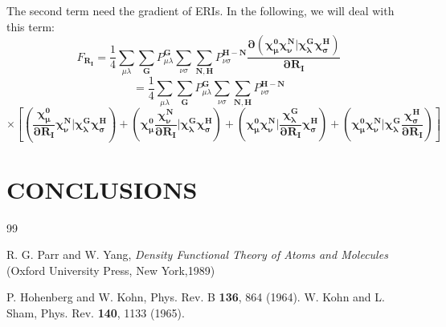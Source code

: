 \documentclass[aps,preprint,12pt]{revtex4-1}
\begin{document}
The second term need the gradient of ERIs. In the following, we will deal with this term: 
\[
 F_{\mathbf{R_I}}=\frac{1}{4}\sum_{\mu\lambda}\sum_{\mathbf{G}}P_{\mu\lambda}^{\mathbf{G}}\sum_{\nu\sigma}\sum_{\mathbf{N,H}}P_{\nu\sigma}^\mathbf{H-N}\mathbf{ \dfrac{\partial{(\chi_{\mu}^{0}\chi_{\nu}^{N}|\chi_{\lambda}^{G}\chi_{\sigma}^{H})}}{\partial{R_{I}}} }
\]
\[
 =\frac{1}{4}\sum_{\mu\lambda}\sum_{\mathbf{G}}P_{\mu\lambda}^{\mathbf{G}}\sum_{\nu\sigma}\sum_{\mathbf{N,H}}P_{\nu\sigma}^\mathbf{H-N}
\]
\begin{equation}
\times\mathbf{[ (\dfrac{\chi_{\mu}^{0}}{\partial{R_{I}}}\chi_{\nu}^{N}|\chi_{\lambda}^{G}\chi_{\sigma}^{H})
+(\chi_{\mu}^{0}\dfrac{\chi_{\nu}^{N}}{\partial{R_{I}}}|\chi_{\lambda}^{G}\chi_{\sigma}^{H}) 
+(\chi_{\mu}^{0}\chi_{\nu}^{N}|\dfrac{\chi_{\lambda}^{G}}{\partial{R_{I}}}\chi_{\sigma}^{H}) 
+(\chi_{\mu}^{0}\chi_{\nu}^{N}|\chi_{\lambda}^{G}\dfrac{\chi_{\sigma}^{H}}{\partial{R_{I}}})   ]}
\end{equation}




\section{CONCLUSIONS}

\begin{acknowledgments}

\end{acknowledgments}


\begin{thebibliography} {99}

 R. G. Parr and W. Yang, \emph{Density Functional Theory of Atoms and Molecules }(Oxford University Press, New York,1989)

 P. Hohenberg and W. Kohn, Phys. Rev. B {\bf 136}, 864 (1964).
 W. Kohn and L. Sham, Phys. Rev. {\bf 140}, 1133 (1965).


\end{thebibliography}
\end{document}
